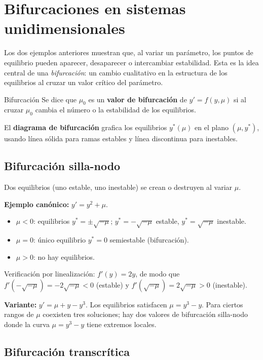 \documentclass[11pt,letterpaper]{article}
\begin{document}
\section{Bifurcaciones en sistemas unidimensionales}
\label{sec:bifurcaciones-unidim}

Los dos ejemplos anteriores muestran que, al variar un parámetro, los puntos de
equilibrio pueden aparecer, desaparecer o intercambiar estabilidad. Esta es la
idea central de una \emph{bifurcación}: un cambio cualitativo en la estructura
de los equilibrios al cruzar un valor crítico del parámetro.

\begin{definicion}{Bifurcación}{}
Se dice que $\mu_0$ es un \textbf{valor de bifurcación} de $y'=f(y,\mu)$
si al cruzar $\mu_0$ cambia el número o la estabilidad de los equilibrios.
\end{definicion}

El \textbf{diagrama de bifurcación} grafica los equilibrios $y^*(\mu)$ en el
plano $(\mu,y^*)$, usando línea sólida para ramas estables y línea discontinua
para inestables.

\subsection{Bifurcación silla-nodo}

Dos equilibrios (uno estable, uno inestable) se crean o destruyen al variar $\mu$.

\textbf{Ejemplo canónico:} $y'=y^2+\mu$.
\begin{itemize}
    \item $\mu<0$: equilibrios $y^*=\pm\sqrt{-\mu}$; $y^*=-\sqrt{-\mu}$ estable, $y^*=\sqrt{-\mu}$ inestable.
    \item $\mu=0$: único equilibrio $y^*=0$ semiestable (bifurcación).
    \item $\mu>0$: no hay equilibrios.
\end{itemize}
Verificación por linealización: $f'(y)=2y$, de modo que
$f'(-\sqrt{-\mu})=-2\sqrt{-\mu}<0$ (estable) y $f'(\sqrt{-\mu})=2\sqrt{-\mu}>0$ (inestable).

\textbf{Variante:} $y'=\mu+y-y^3$. Los equilibrios satisfacen $\mu=y^3-y$.
Para ciertos rangos de $\mu$ coexisten tres soluciones; hay dos valores de
bifurcación silla-nodo donde la curva $\mu=y^3-y$ tiene extremos locales.

\subsection{Bifurcación transcrítica}
\end{document}

